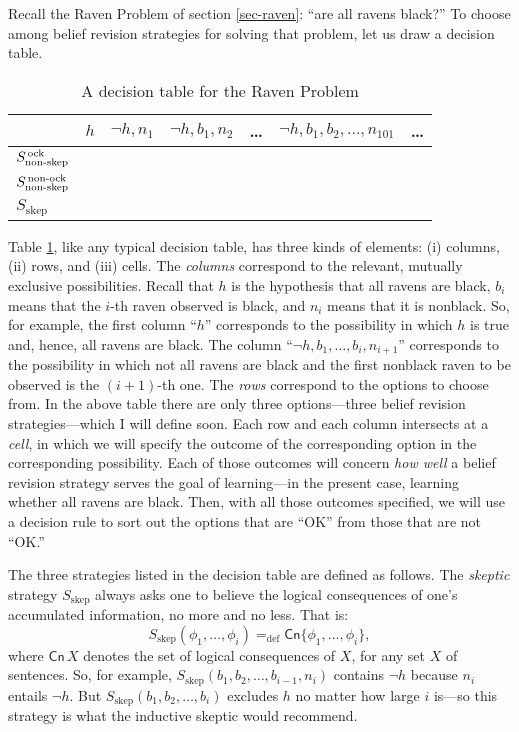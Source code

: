 Recall the Raven Problem of section \ref{sec-raven}: ``are all ravens black?'' To choose among belief revision strategies for solving that problem, let us draw a decision table.
\begin{table}[ht]
\centering
\begin{tabular}{lcccccc}
	& $h$ & $\neg h, n_1$ & $\neg h, b_1, n_2$ & \ldots & $\neg h, b_1, b_2, \ldots, n_{101}$ & \ldots 
\\ \hline\hline
  	$S_{\textrm{non-skep}}^{\textrm{\,ock}}$ &&&&&& \\
  	$S_{\textrm{non-skep}}^{\textrm{\,non-ock}}$ &&&&&& \\
  	$S_{\textrm{skep}}$ &&&&&& \\
\end{tabular}
\caption{A decision table for the Raven Problem}\label{lin-table1}
\end{table}
Table \ref{lin-table1}, like any typical decision table, has three kinds of elements: (i) columns, (ii) rows, and (iii) cells. The {\em columns} correspond to the relevant, mutually exclusive possibilities. Recall that $h$ is the hypothesis that all ravens are black, $b_i$ means that the $i$-th raven observed is black, and $n_i$ means that it is nonblack. So, for example, the first column ``$h$'' corresponds to the possibility in which $h$ is true and, hence, all ravens are black. The column ``$\neg h, b_1, \dots, b_i, n_{i+1}$'' corresponds to the possibility in which not all ravens are black and the first nonblack raven to be observed is the $(i+1)$-th one. The {\em rows} correspond to the options to choose from. In the above table there are only three options---three belief revision strategies---which I will define soon. Each row and each column intersects at a {\em cell}, in which we will specify the outcome of the corresponding option in the corresponding possibility. Each of those outcomes will concern {\em how well} a belief revision strategy serves the goal of learning---in the present case, learning whether all ravens are black. Then, with all those outcomes specified, we will use a decision rule to sort out the options that are ``OK'' from those that are not ``OK.'' 

The three strategies listed in the decision table are defined as follows. The {\em skeptic} strategy $S_{\textrm{skep}}$ always asks one to believe the logical consequences of one's accumulated information, no more and no less. That is:
$$S_{\textrm{skep}}(\phi_1, \ldots, \phi_i) =_\text{def} \mathsf{Cn}\{\phi_1, \ldots, \phi_i\},$$
where $\mathsf{Cn}\,X$ denotes the set of logical consequences of $X$, for any set $X$ of sentences. So, for example, $S_{\textrm{skep}}(b_1, b_2, \dots, b_{i-1}, n_i)$ contains $\neg h$ because $n_i$ entails $\neg h$. But $S_{\textrm{skep}}(b_1, b_2, \dots, b_i)$ excludes $h$ no matter how large $i$ is---so this strategy is what the inductive skeptic would recommend.  

